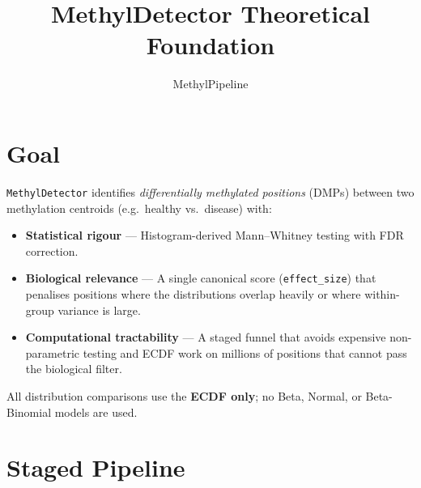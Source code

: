 \documentclass[11pt]{article}
\title{MethylDetector Theoretical Foundation}
\author{MethylPipeline}
\date{}
\begin{document}
\maketitle
\tableofcontents
\newpage

\section{Goal}

\texttt{MethylDetector} identifies \emph{differentially methylated positions}
(DMPs) between two methylation centroids (e.g.\ healthy vs.\ disease) with:

\begin{itemize}
  \item \textbf{Statistical rigour} --- Histogram-derived Mann--Whitney
        testing with FDR correction.
  \item \textbf{Biological relevance} --- A single canonical score
        (\texttt{effect\_size}) that penalises positions where the
        distributions overlap heavily or where within-group variance is large.
  \item \textbf{Computational tractability} --- A staged funnel that avoids
        expensive non-parametric testing and ECDF work on millions of
        positions that cannot pass the biological filter.
\end{itemize}

All distribution comparisons use the \textbf{ECDF only}; no Beta, Normal, or
Beta-Binomial models are used.

\section{Staged Pipeline}
\end{document}
